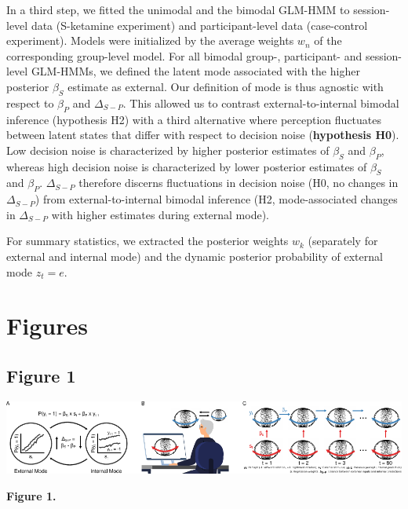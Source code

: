 \documentclass[
]{article}
\begin{document}
In a third step, we fitted the unimodal and the bimodal GLM-HMM to
session-level data (S-ketamine experiment) and participant-level data
(case-control experiment). Models were initialized by the average
weights \(w_n\) of the corresponding group-level model. For all bimodal
group-, participant- and session-level GLM-HMMs, we defined the latent
mode associated with the higher posterior \(\beta_S\) estimate as
external. Our definition of mode is thus agnostic with respect to
\(\beta_P\) and \(\Delta_{S-P}\). This allowed us to contrast
external-to-internal bimodal inference (hypothesis H2) with a third
alternative where perception fluctuates between latent states that
differ with respect to decision noise (\textbf{hypothesis H0}). Low
decision noise is characterized by higher posterior estimates of
\(\beta_S\) and \(\beta_P\), whereas high decision noise is
characterized by lower posterior estimates of \(\beta_S\) and
\(\beta_P\). \(\Delta_{S-P}\) therefore discerns fluctuations in
decision noise (H0, no changes in \(\Delta_{S-P}\)) from
external-to-internal bimodal inference (H2, mode-associated changes in
\(\Delta_{S-P}\) with higher estimates during external mode).

For summary statistics, we extracted the posterior weights \(w_k\)
(separately for external and internal mode) and the dynamic posterior
probability of external mode \(z_t = e\).

\newpage

\hypertarget{figures}{%
\section{Figures}\label{figures}}

\hypertarget{figure-1}{%
\subsection{Figure 1}\label{figure-1}}

\includegraphics{modes_ketamine_scz_files/figure-latex/rev_Figure_1-1b.pdf}

\textbf{Figure 1.}
\end{document}
